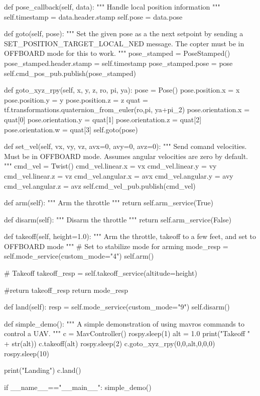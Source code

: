 \documentclass[a4paper,12pt]{article}
\begin{document}
\begin{MyCode}
	def pose_callback(self, data):
		"""
		Handle local position information
		"""
		self.timestamp = data.header.stamp
		self.pose = data.pose
		
	def goto(self, pose):
		"""
		Set the given pose as a the next setpoint by sending
		a SET_POSITION_TARGET_LOCAL_NED message.
		The copter must be in OFFBOARD mode for this to work.
		"""
		pose_stamped = PoseStamped()
		pose_stamped.header.stamp = self.timestamp
		pose_stamped.pose = pose
		self.cmd_pos_pub.publish(pose_stamped)
		
	def goto_xyz_rpy(self, x, y, z, ro, pi, ya):
		pose = Pose()
		pose.position.x = x
		pose.position.y = y
		pose.position.z = z
		quat = tf.transformations.quaternion_from_euler(ro,pi,
		 					     ya+pi_2)
		pose.orientation.x = quat[0]
		pose.orientation.y = quat[1]
		pose.orientation.z = quat[2]
		pose.orientation.w = quat[3]
		self.goto(pose)
		
	def set_vel(self, vx, vy, vz, avx=0, avy=0, avz=0):
		"""
		Send comand velocities. Must be in OFFBOARD mode.
		Assumes angular velocities are zero by default.
		"""
		cmd_vel = Twist()
		cmd_vel.linear.x = vx
		cmd_vel.linear.y = vy
		cmd_vel.linear.z = vz
		cmd_vel.angular.x = avx
		cmd_vel.angular.y = avy
		cmd_vel.angular.z = avz
		self.cmd_vel_pub.publish(cmd_vel)
		
	def arm(self):
		"""
		Arm the throttle
		"""
		return self.arm_service(True)
		
	def disarm(self):
		"""
		Disarm the throttle
		"""
		return self.arm_service(False)
		
	def takeoff(self, height=1.0):
		"""
		Arm the throttle, takeoff to a few feet, and
		set to OFFBOARD mode
		"""
		# Set to stabilize mode for arming
		mode_resp = self.mode_service(custom_mode="4")
		self.arm()
	
		# Takeoff
		takeoff_resp = self.takeoff_service(altitude=height)
		
		#return takeoff_resp
		return mode_resp
		
	def land(self):	
		resp = self.mode_service(custom_mode="9")
		self.disarm()
	
def simple_demo():
	"""
	A simple demonstration of using
	mavros commands to control a UAV.
	"""
	c = MavController()
	rospy.sleep(1)
	alt = 1.0
	print("Takeoff " + str(alt))
	c.takeoff(alt)
	rospy.sleep(2)
	c.goto_xyz_rpy(0,0,alt,0,0,0)
	rospy.sleep(10)
	
	print("Landing")
	c.land()
	
if __name__=="__main__":
	simple_demo()

\end{MyCode}
\end{document}
